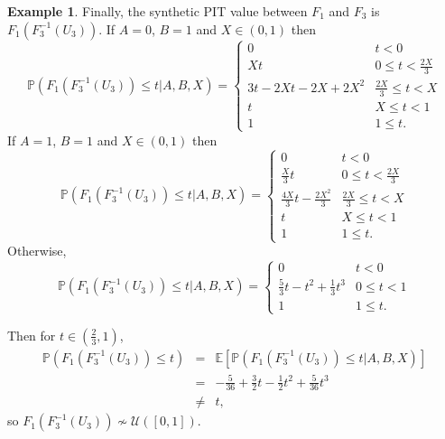 \documentclass[aap]{imsart}
\theoremstyle{plain}
\theoremstyle{definition}
\newtheorem{example}[theorem]{Example}
\begin{document}
\begin{example}
Finally, the synthetic PIT value between $F_1$ and $F_3$ is $F_1(F_3^{-1}(U_3))$. If $A = 0$, $B = 1$ and $X \in (0,1)$ then
\begin{equation*}
  \mathbb{P}(F_1(F_3^{-1}(U_3)) \leq t|A, B, X) = \begin{cases}
    0                    & t < 0 \\
    Xt                   & 0 \leq t < \frac{2X}{3} \\
    3t - 2Xt - 2X + 2X^2 & \frac{2X}{3} \leq t < X \\
    t                    & X \leq t < 1 \\
    1                    & 1 \leq t.
  \end{cases}
\end{equation*}
If $A = 1$, $B = 1$ and $X \in (0,1)$ then
\begin{equation*}
  \mathbb{P}(F_1(F_3^{-1}(U_3)) \leq t|A, B, X) = \begin{cases}
    0                              & t < 0 \\
    \frac{X}{3}t                   & 0 \leq t < \frac{2X}{3} \\
    \frac{4X}{3}t - \frac{2X^2}{3} & \frac{2X}{3} \leq t < X \\
    t                              & X \leq t < 1 \\
    1                              & 1 \leq t.
  \end{cases}
\end{equation*}
Otherwise,
\begin{equation*}
  \mathbb{P}(F_1(F_3^{-1}(U_3)) \leq t|A, B, X) = \begin{cases}
    0                                   & t < 0 \\
    \frac{5}{3}t - t^2 + \frac{1}{3}t^3 & 0 \leq t < 1 \\
    1                                   & 1 \leq t.
  \end{cases}
\end{equation*}

Then for $t \in \left(\frac{2}{3},1\right)$,
\begin{eqnarray*}
  \mathbb{P}(F_1(F_3^{-1}(U_3)) \leq t) & = & \mathbb{E}[\mathbb{P}(F_1(F_3^{-1}(U_3)) \leq t|A, B, X)] \\
                                        & = & -\frac{5}{36} + \frac{3}{2}t - \frac{1}{2}t^2 + \frac{5}{36}t^3 \\
                                        & \neq & t,
\end{eqnarray*}
so $F_1(F_3^{-1}(U_3)) \nsim \mathcal{U}([0,1])$.
\end{example}
\end{document}
